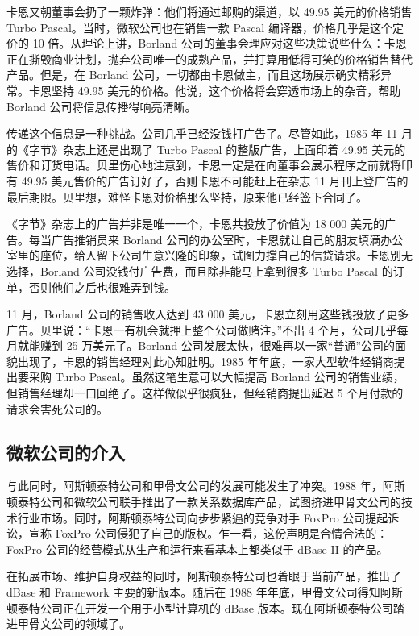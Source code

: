 \documentclass[12pt,UTF8]{ctexbook}
\begin{document}
卡恩又朝董事会扔了一颗炸弹：他们将通过邮购的渠道，以 49.95 美元的价格销售 Turbo Pascal。当时，微软公司也在销售一款 Pascal 编译器，价格几乎是这个定价的 10 倍。从理论上讲，Borland 公司的董事会理应对这些决策说些什么：卡恩正在撕毁商业计划，抛弃公司唯一的成熟产品，并打算用低得可笑的价格销售替代产品。但是，在 Borland 公司，一切都由卡恩做主，而且这场展示确实精彩异常。卡恩坚持 49.95 美元的价格。他说，这个价格将会穿透市场上的杂音，帮助 Borland 公司将信息传播得响亮清晰。

传递这个信息是一种挑战。公司几乎已经没钱打广告了。尽管如此，1985 年 11 月的《字节》杂志上还是出现了 Turbo Pascal 的整版广告，上面印着 49.95 美元的售价和订货电话。贝里伤心地注意到，卡恩一定是在向董事会展示程序之前就将印有 49.95 美元售价的广告订好了，否则卡恩不可能赶上在杂志 11 月刊上登广告的最后期限。贝里想，难怪卡恩对价格那么坚持，原来他已经签下合同了。

《字节》杂志上的广告并非是唯一一个，卡恩共投放了价值为 18 000 美元的广告。每当广告推销员来 Borland 公司的办公室时，卡恩就让自己的朋友填满办公室里的座位，给人留下公司生意兴隆的印象，试图力撑自己的信贷请求。卡恩别无选择，Borland 公司没钱付广告费，而且除非能马上拿到很多 Turbo Pascal 的订单，否则他们之后也很难弄到钱。

11 月，Borland 公司的销售收入达到 43 000 美元，卡恩立刻用这些钱投放了更多广告。贝里说：“卡恩一有机会就押上整个公司做赌注。”不出 4 个月，公司几乎每月就能赚到 25 万美元了。Borland 公司发展太快，很难再以一家“普通”公司的面貌出现了，卡恩的销售经理对此心知肚明。1985 年年底，一家大型软件经销商提出要采购 Turbo Pascal。虽然这笔生意可以大幅提高 Borland 公司的销售业绩，但销售经理却一口回绝了。这样做似乎很疯狂，但经销商提出延迟 5 个月付款的请求会害死公司的。





\subsection{微软公司的介入}


与此同时，阿斯顿泰特公司和甲骨文公司的发展可能发生了冲突。1988 年，阿斯顿泰特公司和微软公司联手推出了一款关系数据库产品，试图挤进甲骨文公司的技术行业市场。同时，阿斯顿泰特公司向步步紧逼的竞争对手 FoxPro 公司提起诉讼，宣称 FoxPro 公司侵犯了自己的版权。乍一看，这份声明是合情合法的：FoxPro 公司的经营模式从生产和运行来看基本上都类似于 dBase II 的产品。

在拓展市场、维护自身权益的同时，阿斯顿泰特公司也着眼于当前产品，推出了 dBase 和 Framework 主要的新版本。随后在 1988 年年底，甲骨文公司得知阿斯顿泰特公司正在开发一个用于小型计算机的 dBase 版本。现在阿斯顿泰特公司踏进甲骨文公司的领域了。
\end{document}
